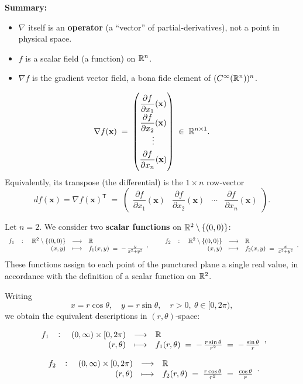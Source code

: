 \documentclass[11pt,openany]{article}
\renewcommand{\emph}[1]{\textbf{#1}}
\begin{document}
\noindent\textbf{Summary:}
\begin{itemize}
	\item \(\nabla\) itself is an \emph{operator} (a “vector” of partial‐derivatives), not a point in physical space.
	\item \(f\) is a scalar field (a function) on \(\mathbb{R}^n\).
	\item \(\nabla f\) is the gradient vector field, a bona fide element of \((C^\infty(\mathbb{R}^n))^n\).
\end{itemize}
\[
\nabla f(\mathbf x)
\;=\;
\begin{pmatrix}
	\dfrac{\partial f}{\partial x_1}(\mathbf x)\\[6pt]
	\dfrac{\partial f}{\partial x_2}(\mathbf x)\\[4pt]
	\vdots\\[4pt]
	\dfrac{\partial f}{\partial x_n}(\mathbf x)
\end{pmatrix}
\;\in\;\mathbb{R}^{n\times1}.
\]
Equivalently, its transpose (the differential) is the \(1\times n\) row‐vector
\[
d f(\mathbf x)
=\nabla f(\mathbf x)^{\mathsf T}
\;=\;
\begin{pmatrix}
	\dfrac{\partial f}{\partial x_1}(\mathbf x)
	&\dfrac{\partial f}{\partial x_2}(\mathbf x)
	&\cdots
	&\dfrac{\partial f}{\partial x_n}(\mathbf x)
\end{pmatrix}.
\]

\vfill
\begin{example*}
	Let \(n=2\).  We consider two \emph{scalar functions} on \(\mathbb{R}^2\setminus\{(0,0)\}\):
	\[
	\fullfunction{f_1}{\R^2\setminus\{(0,0)\}}{\R}{(x,y)}
	{f_1(x,y)\;=\;-\,\frac{y}{x^2+y^2}},
	\qquad
	\fullfunction{f_2}{\R^2\setminus\{(0,0)\}}{\R}{(x,y)}
	{f_2(x,y)\;=\;\frac{x}{x^2+y^2}}.
	\]
	These functions assign to each point of the punctured plane a single real value, in accordance with the definition of a scalar function on \(\mathbb{R}^2\).
	
	Writing 
	\[
	x = r\cos\theta,\quad y = r\sin\theta,
	\quad r>0,\ \theta\in[0,2\pi),
	\]
	we obtain the equivalent descriptions in \((r,\theta)\)‐space:
	
	\[
	\fullfunction{f_1}{(0,\infty)\times[0,2\pi)}{\R}{(r,\theta)}
	{f_1(r,\theta) \;=\; -\,\frac{r\sin\theta}{r^2}
		\;=\; -\,\frac{\sin\theta}{r}},
	\]
	
	\[
	\fullfunction{f_2}{(0,\infty)\times[0,2\pi)}{\R}{(r,\theta)}
	{f_2(r,\theta) \;=\; \frac{r\cos\theta}{r^2}
		\;=\; \frac{\cos\theta}{r}}.
	\]
\end{example*}
	
\end{document}
